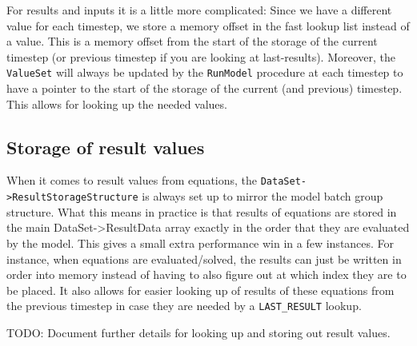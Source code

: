 \documentclass[11pt]{article}
\theoremstyle{definition}
\begin{document}
For results and inputs it is a little more complicated: Since we have a different value for each timestep, we store a memory offset in the fast lookup list instead of a value. This is a memory offset from the start of the storage of the current timestep (or previous timestep if you are looking at last-results). Moreover, the {\tt ValueSet} will always be updated by the {\tt RunModel} procedure at each timestep to have a pointer to the start of the storage of the current (and previous) timestep. This allows for looking up the needed values.

\subsection{Storage of result values}

When it comes to result values from equations, the {\tt DataSet->ResultStorageStructure} is always set up to mirror the model batch group structure. What this means in practice is that results of equations are stored in the main DataSet->ResultData array exactly in the order that they are evaluated by the model. This gives a small extra performance win in a few instances. For instance, when equations are evaluated/solved, the results can just be written in order into memory instead of having to also figure out at which index they are to be placed. It also allows for easier looking up of results of these equations from the previous timestep in case they are needed by a {\tt LAST\_RESULT} lookup.

TODO: Document further details for looking up and storing out result values.
\end{document}
